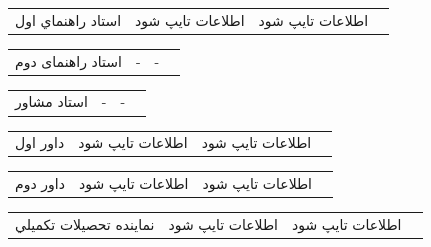 \noindent\begin{tabular}{@{}p{\dimexpr(\linewidth-8\tabcolsep)/4\relax}p{\dimexpr(\linewidth-8\tabcolsep)/4\relax}p{\dimexpr(\linewidth-8\tabcolsep)/4\relax}p{\dimexpr(\linewidth-8\tabcolsep)/4\relax}@{}}
استاد راهنماي اول & اطلاعات تايپ شود & اطلاعات تايپ شود &  \\
\end{tabular}\par\smallskip
\noindent\begin{tabular}{@{}p{\dimexpr(\linewidth-8\tabcolsep)/4\relax}p{\dimexpr(\linewidth-8\tabcolsep)/4\relax}p{\dimexpr(\linewidth-8\tabcolsep)/4\relax}p{\dimexpr(\linewidth-8\tabcolsep)/4\relax}@{}}
استاد راهنمای دوم & {-} & {-} &  \\
\end{tabular}\par\smallskip
\noindent\begin{tabular}{@{}p{\dimexpr(\linewidth-8\tabcolsep)/4\relax}p{\dimexpr(\linewidth-8\tabcolsep)/4\relax}p{\dimexpr(\linewidth-8\tabcolsep)/4\relax}p{\dimexpr(\linewidth-8\tabcolsep)/4\relax}@{}}
استاد مشاور & {-} & {-} &  \\
\end{tabular}\par\smallskip
\noindent\begin{tabular}{@{}p{\dimexpr(\linewidth-8\tabcolsep)/4\relax}p{\dimexpr(\linewidth-8\tabcolsep)/4\relax}p{\dimexpr(\linewidth-8\tabcolsep)/4\relax}p{\dimexpr(\linewidth-8\tabcolsep)/4\relax}@{}}
داور اول & اطلاعات تايپ شود & اطلاعات تايپ شود &  \\
\end{tabular}\par\smallskip
\noindent\begin{tabular}{@{}p{\dimexpr(\linewidth-8\tabcolsep)/4\relax}p{\dimexpr(\linewidth-8\tabcolsep)/4\relax}p{\dimexpr(\linewidth-8\tabcolsep)/4\relax}p{\dimexpr(\linewidth-8\tabcolsep)/4\relax}@{}}
داور دوم & اطلاعات تايپ شود & اطلاعات تايپ شود &  \\
\end{tabular}\par\smallskip
\noindent\begin{tabular}{@{}p{\dimexpr(\linewidth-8\tabcolsep)/4\relax}p{\dimexpr(\linewidth-8\tabcolsep)/4\relax}p{\dimexpr(\linewidth-8\tabcolsep)/4\relax}p{\dimexpr(\linewidth-8\tabcolsep)/4\relax}@{}}
نماينده تحصيلات تکميلي & اطلاعات تايپ شود & اطلاعات تايپ شود &  \\
\end{tabular}\par\smallskip
